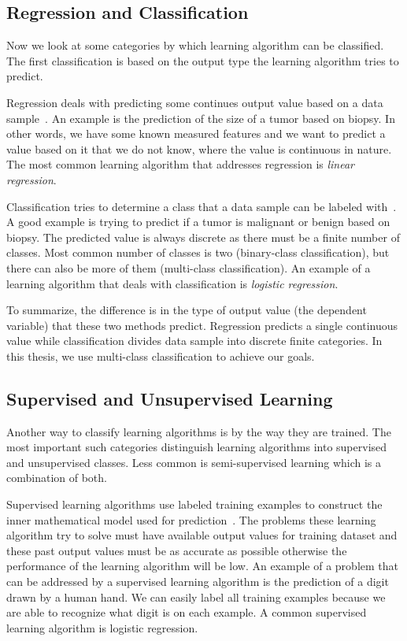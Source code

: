\subsection{Regression and Classification}

Now we look at some categories by which learning algorithm can be classified. The first classification is based on the output type the learning algorithm tries to predict.

Regression deals with predicting some continues output value based on a data sample~\cite{worster2007understanding}. An example is the prediction of the size of a tumor based on biopsy. In other words, we have some known measured features and we want to predict a value based on it that we do not know, where the value is continuous in nature. The most common learning algorithm that addresses regression is \textit{linear regression}.

Classification tries to determine a class that a data sample can be labeled with~\cite{worster2007understanding}. A good example is trying to predict if a tumor is malignant or benign based on biopsy. The predicted value is always discrete as there must be a finite number of classes. Most common number of classes is two (binary-class classification), but there can also be more of them (multi-class classification). An example of a learning algorithm that deals with classification is \textit{logistic regression}.

To summarize, the difference is in the type of output value (the dependent variable) that these two methods predict. Regression predicts a single continuous value while classification divides data sample into discrete finite categories. In this thesis, we use multi-class classification to achieve our goals.

\subsection{Supervised and Unsupervised Learning}

Another way to classify learning algorithms is by the way they are trained. The most important such categories distinguish learning algorithms into supervised and unsupervised classes. Less common is semi-supervised learning which is a combination of both.

Supervised learning algorithms use labeled training examples to construct the inner mathematical model used for prediction~\cite{donalek2014supervised}. The problems these learning algorithm try to solve must have available output values for training dataset and these past output values must be as accurate as possible otherwise the performance of the learning algorithm will be low. An example of a problem that can be addressed by a supervised learning algorithm is the prediction of a digit drawn by a human hand. We can easily label all training examples because we are able to recognize what digit is on each example. A common supervised learning algorithm is logistic regression.

